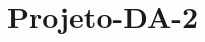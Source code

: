 \chapter{Projeto-\/\+DA-\/2}
\hypertarget{md__r_e_a_d_m_e}{}\label{md__r_e_a_d_m_e}
\label{md__r_e_a_d_m_e_autotoc_md0}%
%
